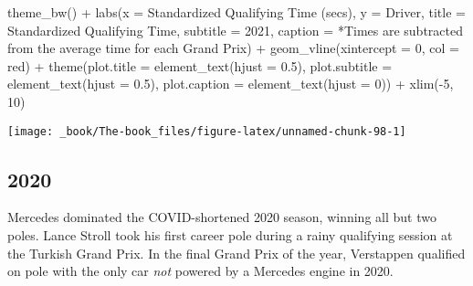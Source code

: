 \documentclass[
]{book}
\newenvironment{Shaded}{\begin{snugshade}}{\end{snugshade}}
\newcommand{\AttributeTok}[1]{\textcolor[rgb]{0.77,0.63,0.00}{#1}}
\newcommand{\DecValTok}[1]{\textcolor[rgb]{0.00,0.00,0.81}{#1}}
\newcommand{\FloatTok}[1]{\textcolor[rgb]{0.00,0.00,0.81}{#1}}
\newcommand{\FunctionTok}[1]{\textcolor[rgb]{0.00,0.00,0.00}{#1}}
\newcommand{\NormalTok}[1]{#1}
\newcommand{\SpecialCharTok}[1]{\textcolor[rgb]{0.00,0.00,0.00}{#1}}
\newcommand{\StringTok}[1]{\textcolor[rgb]{0.31,0.60,0.02}{#1}}
\begin{document}
\begin{Shaded}
\begin{Highlighting}[]
  \FunctionTok{theme\_bw}\NormalTok{() }\SpecialCharTok{+}
  \FunctionTok{labs}\NormalTok{(}\AttributeTok{x =} \StringTok{\textquotesingle{}Standardized Qualifying Time (secs)\textquotesingle{}}\NormalTok{,}
       \AttributeTok{y =} \StringTok{\textquotesingle{}Driver\textquotesingle{}}\NormalTok{,}
       \AttributeTok{title =} \StringTok{\textquotesingle{}Standardized Qualifying Time\textquotesingle{}}\NormalTok{,}
       \AttributeTok{subtitle =} \StringTok{\textquotesingle{}2021\textquotesingle{}}\NormalTok{,}
       \AttributeTok{caption =} \StringTok{\textquotesingle{}*Times are subtracted from the average time for each Grand Prix\textquotesingle{}}\NormalTok{) }\SpecialCharTok{+}
  \FunctionTok{geom\_vline}\NormalTok{(}\AttributeTok{xintercept =} \DecValTok{0}\NormalTok{, }\AttributeTok{col =} \StringTok{\textquotesingle{}red\textquotesingle{}}\NormalTok{) }\SpecialCharTok{+}
  \FunctionTok{theme}\NormalTok{(}\AttributeTok{plot.title =} \FunctionTok{element\_text}\NormalTok{(}\AttributeTok{hjust =} \FloatTok{0.5}\NormalTok{),}
        \AttributeTok{plot.subtitle =} \FunctionTok{element\_text}\NormalTok{(}\AttributeTok{hjust =} \FloatTok{0.5}\NormalTok{),}
        \AttributeTok{plot.caption =} \FunctionTok{element\_text}\NormalTok{(}\AttributeTok{hjust =} \DecValTok{0}\NormalTok{)) }\SpecialCharTok{+}
  \FunctionTok{xlim}\NormalTok{(}\SpecialCharTok{{-}}\DecValTok{5}\NormalTok{, }\DecValTok{10}\NormalTok{)}
\end{Highlighting}
\end{Shaded}

\begin{center}\texttt{[image: \_book/The-book\_files/figure-latex/unnamed-chunk-98-1]} \end{center}

\hypertarget{section-3}{%
\subsection{2020}\label{section-3}}

Mercedes dominated the COVID-shortened 2020 season, winning all but two poles. Lance Stroll took his first career pole during a rainy qualifying session at the Turkish Grand Prix. In the final Grand Prix of the year, Verstappen qualified on pole with the only car \emph{not} powered by a Mercedes engine in 2020.
\end{document}
